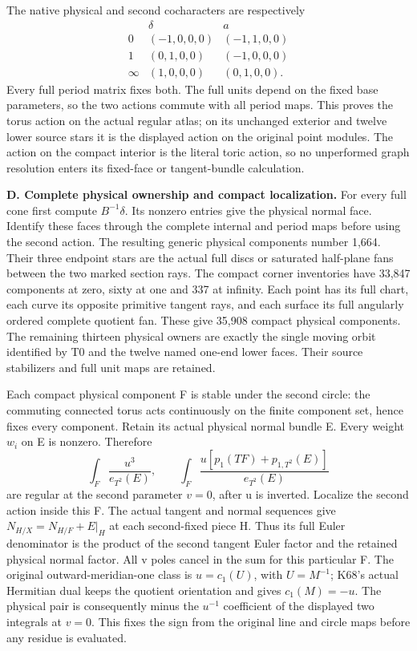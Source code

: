 The native physical and second cocharacters are respectively
\[
\begin{array}{c|cc}
&\delta&a\\\hline
0&(-1,0,0,0)&(-1,1,0,0)\\
1&(0,1,0,0)&(-1,0,0,0)\\
\infty&(1,0,0,0)&(0,1,0,0).
\end{array}
\]
Every full period matrix fixes both.  The full units depend on the fixed
base parameters, so the two actions commute with all period maps.  This
proves the torus action on the actual regular atlas; on its unchanged
exterior and twelve lower source stars it is the displayed action on the
original point modules.  The action on the compact interior is the
literal toric action, so no unperformed graph resolution enters its
fixed-face or tangent-bundle calculation.

\medskip\noindent\textbf{D. Complete physical ownership and compact localization.}
For every full cone first compute \(B^{-1}\delta\).  Its nonzero entries
give the physical normal face.  Identify these faces through the complete
internal and period maps before using the second action.  The resulting
generic physical components number 1,664.  Their three endpoint stars are
the actual full discs or saturated half-plane fans between the two marked
section rays.  The compact corner inventories have 33,847 components at
zero, sixty at one and 337 at infinity.  Each point has its full chart,
each curve its opposite primitive tangent rays, and each surface its full
angularly ordered complete quotient fan.  These give 35,908 compact
physical components.  The remaining thirteen physical owners are exactly
the single moving orbit identified by T0 and the twelve named one-end
lower faces.  Their source stabilizers and full unit maps are retained.

Each compact physical component F is stable under the second circle:
the commuting connected torus acts continuously on the finite component
set, hence fixes every component.  Retain its actual physical normal
bundle E.  Every weight \(w_i\) on E is nonzero.  Therefore
\[
\int_F\frac{u^3}{e_{T^2}(E)},\qquad
\int_F\frac{u[p_1(TF)+p_{1,T^2}(E)]}{e_{T^2}(E)}
\]
are regular at the second parameter \(v=0\), after u is inverted.
Localize the second action inside this F.  The actual tangent and normal
sequences give
\(N_{H/X}=N_{H/F}+E|_H\) at each second-fixed piece H.  Thus its full
Euler denominator is the product of the second tangent Euler factor and
the retained physical normal factor.  All v poles cancel in the sum for
this particular F.  The original outward-meridian-one class is
\(u=c_1(U)\), with \(U=M^{-1}\); K68's actual Hermitian dual keeps
the quotient orientation and gives \(c_1(M)=-u\).  The physical pair
is consequently minus the \(u^{-1}\) coefficient of the displayed
two integrals at \(v=0\).  This fixes the sign from the original line
and circle maps before any residue is evaluated.

